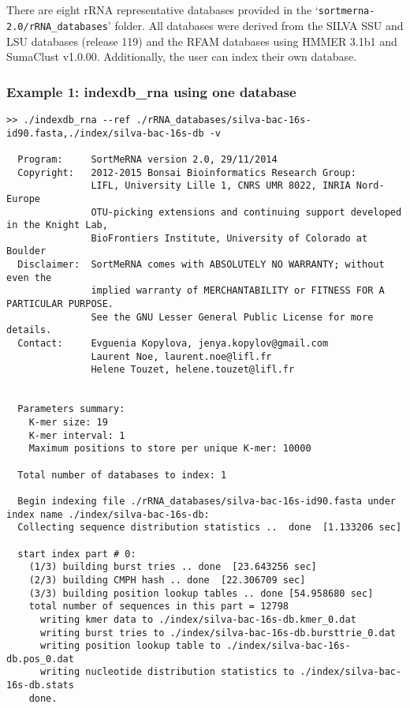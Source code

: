 \documentclass[10pt,a4paper]{article}
\begin{document}
~\\~\\
\noindent There are eight rRNA representative databases provided in the `\texttt{sortmerna-2.0/rRNA\_databases}' folder. 
All databases were derived from the SILVA SSU and LSU databases (release 119) and the RFAM databases using HMMER 3.1b1 and SumaClust v1.0.00.
Additionally, the user can index their own database. \\

\subsubsection{Example 1: indexdb\_rna using one database}

\begin{Verbatim}[fontsize=\footnotesize]
>> ./indexdb_rna --ref ./rRNA_databases/silva-bac-16s-id90.fasta,./index/silva-bac-16s-db -v

  Program:     SortMeRNA version 2.0, 29/11/2014
  Copyright:   2012-2015 Bonsai Bioinformatics Research Group:
               LIFL, University Lille 1, CNRS UMR 8022, INRIA Nord-Europe
               OTU-picking extensions and continuing support developed in the Knight Lab,
               BioFrontiers Institute, University of Colorado at Boulder
  Disclaimer:  SortMeRNA comes with ABSOLUTELY NO WARRANTY; without even the
               implied warranty of MERCHANTABILITY or FITNESS FOR A PARTICULAR PURPOSE.
               See the GNU Lesser General Public License for more details.
  Contact:     Evguenia Kopylova, jenya.kopylov@gmail.com 
               Laurent Noe, laurent.noe@lifl.fr
               Helene Touzet, helene.touzet@lifl.fr


  Parameters summary: 
    K-mer size: 19
    K-mer interval: 1
    Maximum positions to store per unique K-mer: 10000

  Total number of databases to index: 1

  Begin indexing file ./rRNA_databases/silva-bac-16s-id90.fasta under index name ./index/silva-bac-16s-db: 
  Collecting sequence distribution statistics ..  done  [1.133206 sec]

  start index part # 0: 
    (1/3) building burst tries .. done  [23.643256 sec]
    (2/3) building CMPH hash .. done  [22.306709 sec]
    (3/3) building position lookup tables .. done [54.958680 sec]
    total number of sequences in this part = 12798
      writing kmer data to ./index/silva-bac-16s-db.kmer_0.dat
      writing burst tries to ./index/silva-bac-16s-db.bursttrie_0.dat
      writing position lookup table to ./index/silva-bac-16s-db.pos_0.dat
      writing nucleotide distribution statistics to ./index/silva-bac-16s-db.stats
    done.
    
\end{Verbatim}
\end{document}

